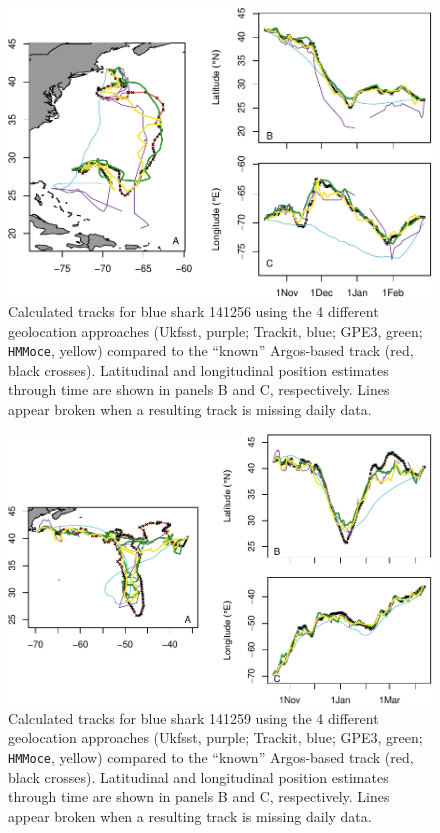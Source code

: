 \begin{figure}[p]
\centering
\includegraphics[width=1\textwidth]{images/A1_Fig3.pdf}
\caption{Calculated tracks for blue shark 141256
using the 4 different geolocation approaches (Ukfsst, purple; Trackit,
blue; GPE3, green; \texttt{HMMoce}, yellow) compared to the ``known''
Argos-based track (red, black crosses). Latitudinal and longitudinal
position estimates through time are shown in panels B and C,
respectively. Lines appear broken when a resulting track is missing
daily data.}
\label{fig:a1f3}
\end{figure}

\begin{figure}[p]
\centering
\includegraphics[width=1\textwidth]{images/A1_Fig4.pdf}
\caption{Calculated tracks for blue shark 141259
using the 4 different geolocation approaches (Ukfsst, purple; Trackit,
blue; GPE3, green; \texttt{HMMoce}, yellow) compared to the ``known''
Argos-based track (red, black crosses). Latitudinal and longitudinal
position estimates through time are shown in panels B and C,
respectively. Lines appear broken when a resulting track is missing
daily data.}
\label{fig:a1f4}
\end{figure}

